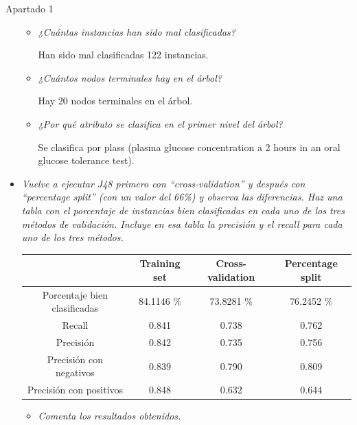 \documentclass[11pt, a4paper, spanish, openright, twoside]{book}
\begin{document}
\begin{section}{Apartado 1}
\begin{itemize}
{{}}

		\begin{itemize}
			 \item \textit{¿Cuántas instancias han sido mal clasificadas?}  
			
			Han sido mal clasificadas 122 instancias.
			
			\item \textit{¿Cuántos nodos terminales hay en el árbol?} 
			
			Hay 20 nodos terminales en el árbol.
			
			\item \textit{¿Por qué atributo se clasifica en el primer nivel del árbol?} 
			
			Se clasifica por plass (plasma glucose concentration a 2 hours in an oral glucose tolerance test).
			
		\end{itemize}

	\item  \textit{Vuelve a ejecutar J48 primero con ``cross-validation'' y después con ``percentage split'' (con un valor 
	del 66\%) y observa las diferencias. Haz una tabla con el porcentaje de instancias bien clasificadas en 
	cada uno de los tres métodos de validación. Incluye en esa tabla la precisión y el recall para cada 
	uno de los tres métodos.}

		\begin{center}
 			 \begin{tabular}{| c | c | c | c |}
 			   \hline
			     				       	  & Training set 	& Cross-validation 		& Percentage split  \\ \hline
			    Porcentaje bien clasificadas  	  & 84.1146 \% 	& 73.8281 \%		& 76.2452 \% \\ \hline			 
			    Recall 			     	  & 0.841  		& 0.738 			& 0.762 \\ \hline 
			    Precisión			      	  & 0.842  		& 0.735 			& 0.756  \\ \hline \hline
			    Precisión con negativos		  & 0.839		& 0.790			& 0.809 \\ \hline
			    Precisión con positivos 		  & 0.848 		& 0.632			& 0.644 \\ 
			    \hline
			  \end{tabular}
		\end{center}

		\begin{itemize}
			 \item \textit{Comenta los resultados obtenidos. }
			

\end{itemize}
\end{itemize}
\end{section}
\end{document}
